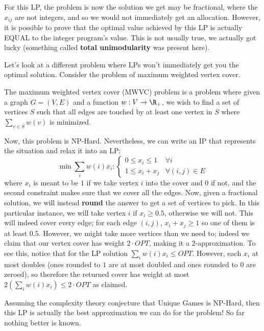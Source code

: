 For this LP, the problem is now the solution we get may be fractional, where the $x_{ij}$ are
not integers, and so we would not immediately get an allocation. However, it is possible to prove
that the optimal value achieved by this LP is actually EQUAL to the integer program's value.
This is not usually true, we actually got lucky (something called \textbf{total unimodularity} was present here).

Let's look at a different problem where LPs won't immediately get you the optimal solution.
Consider the problem of maximum weighted vertex cover.
\begin{definition}
    The maximum weighted vertex cover (MWVC) problem
    is a problem where given a graph $G = (V, E)$ and a function $w: V \to \R_+$,
    we wish to find a set of vertices $S$ such that all edges are touched by at least one vertex in $S$
    where $\sum_{v \in S} w(v)$ is minimized.
\end{definition}
Now, this problem is NP-Hard. Nevertheless, we can write an IP that represents the situation
and relax it into an LP:
\[ \min \sum_i w(i) x_i : \begin{cases}
    0 \le x_i \le 1 & \forall i \\
    1 \le x_i + x_j & \forall (i, j) \in E
\end{cases} \]
where $x_i$ is meant to be $1$ if we take vertex $i$ into the cover and $0$ if not,
and the second constraint makes sure that we cover all the edges.
Now, given a fractional solution, we will instead \textbf{round} the
answer to get a set of vertices to pick. In this particular instance, we will take vertex $i$
if $x_i \ge 0.5$, otherwise we will not. This will indeed cover every edge; for each edge
$(i,j)$, $x_i + x_j \ge 1$ so one of them is at least $0.5$.
However, we might take more vertices than we need to; indeed we claim that our vertex cover
has weight $2 \cdot OPT$, making it a $2$-approximation.
To see this, notice that for the LP solution $\sum_i w(i) x_i \le OPT$.
However, each $x_i$ at most doubles (ones rounded to $1$ are at most doubled
and ones rounded to $0$ are zeroed), so therefore the returned cover has weight at most $2(\sum_i w(i) x_i) \le 2 \cdot OPT$
as claimed.

Assuming the complexity theory conjecture that Unique Games is NP-Hard,
then this LP is actually the best approximation we can do for the problem!
So far nothing better is known.